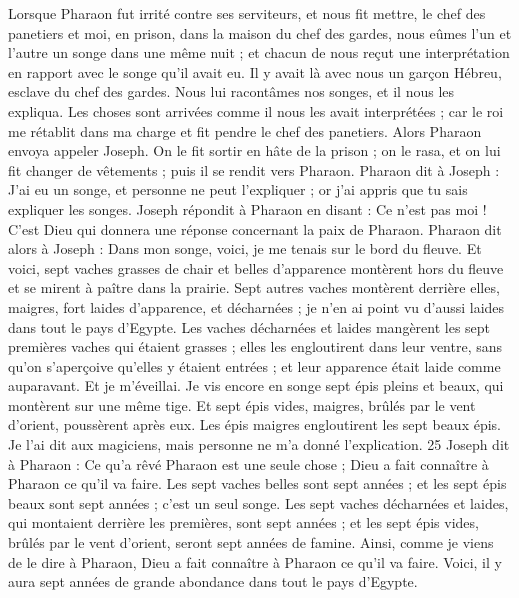 \begin{multicols}{2}
Lorsque Pharaon fut irrité contre ses serviteurs, et nous fit mettre, le chef des panetiers et moi, en prison, dans la maison du chef des gardes,
nous eûmes l’un et l’autre un songe dans une même nuit ; et chacun de nous reçut une interprétation en rapport avec le songe qu’il avait eu.
Il y avait là avec nous un garçon Hébreu, esclave du chef des gardes. Nous lui racontâmes nos songes, et il nous les expliqua.
Les choses sont arrivées comme il nous les avait interprétées ; car le roi me rétablit dans ma charge et fit pendre le chef des panetiers.
Alors Pharaon envoya appeler Joseph.  On le fit sortir en hâte de la prison ; on le rasa, et on lui fit changer de vêtements ; puis il se rendit vers Pharaon.
Pharaon dit à Joseph : J'ai eu un songe, et personne ne peut  l'expliquer ; or j'ai appris que tu sais expliquer les songes.
Joseph répondit à Pharaon en disant : Ce n’est pas moi !  C’est Dieu qui donnera une réponse concernant la paix de Pharaon.
Pharaon dit alors à Joseph : Dans mon songe, voici, je me tenais sur le bord du fleuve.
Et voici, sept vaches grasses de chair et belles d’apparence montèrent hors du fleuve et se mirent à paître dans la prairie.
Sept autres vaches montèrent derrière elles, maigres, fort laides d’apparence, et décharnées ; je n’en ai point vu d’aussi laides dans tout le pays d’Egypte.
Les vaches décharnées et laides mangèrent les sept premières vaches qui étaient grasses ;
elles les engloutirent dans leur ventre, sans qu’on s’aperçoive qu’elles y étaient entrées ; et leur apparence était laide comme auparavant. Et je m’éveillai.
Je vis encore en songe sept épis pleins et beaux, qui montèrent sur une même tige.
Et sept épis vides, maigres, brûlés par le vent d’orient, poussèrent après eux.
Les épis maigres engloutirent les sept beaux épis. Je l’ai dit aux magiciens, mais personne ne m’a donné l’explication. 25 Joseph dit à Pharaon : Ce qu’a rêvé Pharaon est une seule chose ; Dieu a fait connaître à Pharaon ce qu’il va faire.
Les sept vaches belles sont sept années ; et les sept épis beaux sont sept années ; c’est un seul songe.
Les sept vaches décharnées et laides, qui montaient derrière les premières, sont sept années ; et les sept épis vides, brûlés par le vent d’orient, seront sept années de famine.
Ainsi, comme je viens de le dire à Pharaon, Dieu a fait connaître à Pharaon ce qu’il va faire.
Voici, il y aura sept années de grande abondance dans tout le pays d’Egypte.

\end{multicols}

